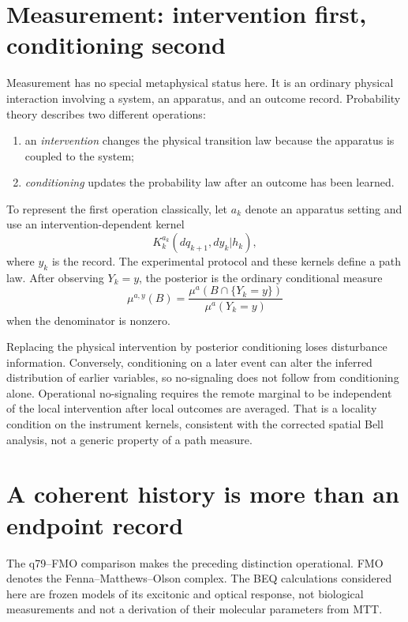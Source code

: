 \documentclass[11pt]{article}
\theoremstyle{definition}
\theoremstyle{remark}
\begin{document}
\section{Measurement: intervention first, conditioning second}

Measurement has no special metaphysical status here.  It is an ordinary
physical interaction involving a system, an apparatus, and an outcome record.
Probability theory describes two different operations:

\begin{enumerate}[label=(\roman*)]
\item an \emph{intervention} changes the physical transition law because the
  apparatus is coupled to the system;
\item \emph{conditioning} updates the probability law after an outcome has
  been learned.
\end{enumerate}

To represent the first operation classically, let \(a_k\) denote an apparatus
setting and use an intervention-dependent kernel
\[
K_k^{a_k}(dq_{k+1},dy_k|h_k),
\]
where \(y_k\) is the record.  The experimental protocol and these kernels
define a path law.  After observing \(Y_k=y\), the posterior is the ordinary
conditional measure
\[
\mu^{a,y}(B)=\frac{\mu^a(B\cap\{Y_k=y\})}
{\mu^a(Y_k=y)}
\]
when the denominator is nonzero.

Replacing the physical intervention by posterior conditioning loses
disturbance information.  Conversely, conditioning on a later event can alter
the inferred distribution of earlier variables, so no-signaling does not
follow from conditioning alone.  Operational no-signaling requires the
remote marginal to be independent of the local intervention after local
outcomes are averaged.  That is a locality condition on the instrument
kernels, consistent with the corrected spatial Bell analysis, not a generic
property of a path measure.

\section{A coherent history is more than an endpoint record}
\label{sec:coherent-history}

The q79--FMO comparison makes the preceding distinction operational. FMO
denotes the Fenna--Matthews--Olson complex. The BEQ calculations considered
here are frozen models of its excitonic and optical response, not biological
measurements and not a derivation of their molecular parameters from MTT.
\end{document}
